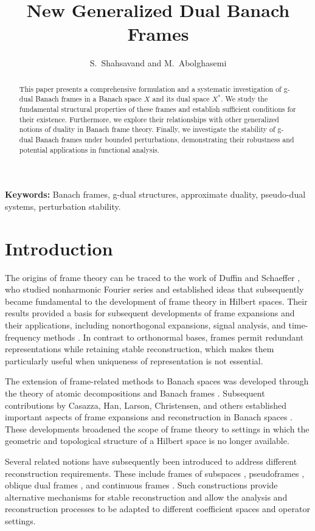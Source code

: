 \documentclass[12pt]{article}
\title{New Generalized Dual Banach Frames}
\author{S.~Shahsavand and M.~Abolghasemi}
\date{}
\theoremstyle{definition}
\theoremstyle{remark}
\begin{document}
\maketitle

\begin{abstract}
This paper presents a comprehensive formulation and a systematic investigation of g-dual Banach frames in a Banach space \(X\) and its dual space \(X^*\). We study the fundamental structural properties of these frames and establish sufficient conditions for their existence. Furthermore, we explore their relationships with other generalized notions of duality in Banach frame theory. Finally, we investigate the stability of g-dual Banach frames under bounded perturbations, demonstrating their robustness and potential applications in functional analysis.
\end{abstract}
\noindent\textbf{Keywords:} Banach frames, g-dual structures, approximate duality, pseudo-dual systems, perturbation stability.

\section*{Introduction}
The origins of frame theory can be traced to the work of Duffin and Schaeffer
\cite{Duffin1952}, who studied nonharmonic Fourier series and established
ideas that subsequently became fundamental to the development of frame
theory in Hilbert spaces. Their results provided a basis for subsequent
developments of frame expansions and their applications, including
nonorthogonal expansions, signal analysis, and time-frequency methods
\cite{Daubechies1986,Casazza2016}. In contrast to orthonormal bases, frames
permit redundant representations while retaining stable reconstruction,
which makes them particularly useful when uniqueness of representation is
not essential.

The extension of frame-related methods to Banach spaces was developed
through the theory of atomic decompositions and Banach frames
\cite{Grochenig1991}. Subsequent contributions by Casazza, Han, Larson,
Christensen, and others established important aspects of frame expansions
and reconstruction in Banach spaces
\cite{Casazza1999,Casazza2005,Stoeva2008}. These developments broadened
the scope of frame theory to settings in which the geometric and
topological structure of a Hilbert space is no longer available.

Several related notions have subsequently been introduced to address
different reconstruction requirements. These include frames of subspaces
\cite{Casazza2004}, pseudoframes \cite{Li2004}, oblique dual frames
\cite{Christensen2004}, and continuous frames \cite{Ali1993}. Such
constructions provide alternative mechanisms for stable reconstruction
and allow the analysis and reconstruction processes to be adapted to
different coefficient spaces and operator settings.
\end{document}
